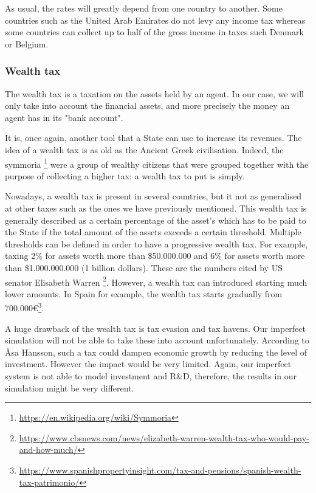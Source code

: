     As usual, the rates will greatly depend from one country to another. Some countries such as the United Arab Emirates do not levy any income tax whereas some countries can collect up to half of the gross income in taxes such Denmark or Belgium.
    
    \subsubsection{Wealth tax}\label{section:wealth_tax}
    
    The wealth tax is a taxation on the assets held by an agent. In our case, we will only take into account the financial assets, and more precisely the money an agent has in its "bank account".
    
    It is, once again, another tool that a State can use to increase its revenues. The idea of a wealth tax is as old as the Ancient Greek civilisation. Indeed, the symmoria \footnote{\url{https://en.wikipedia.org/wiki/Symmoria}} were a group of wealthy citizens that were grouped together with the purpose of collecting a higher tax: a wealth tax to put is simply.
    
    Nowadays, a wealth tax is present in several countries, but it not as generalised at other taxes such as the ones we have previously mentioned. This wealth tax is generally described as a certain percentage of the asset's which has to be paid to the State if the total amount of the assets exceeds a certain threshold. Multiple thresholds can be defined in order to have a progressive wealth tax. For example, taxing 2\% for assets worth more than \$50.000.000 and 6\% for assets worth more than \$1.000.000.000 (1 billion dollars). These are the numbers cited by US senator Elisabeth Warren \footnote{\url{https://www.cbsnews.com/news/elizabeth-warren-wealth-tax-who-would-pay-and-how-much/}}. However, a wealth tax can introduced starting much lower amounts. In Spain for example, the wealth tax starts gradually from 700.000\euro \footnote{\url{https://www.spanishpropertyinsight.com/tax-and-pensions/spanish-wealth-tax-patrimonio/}}.
    
    A huge drawback of the wealth tax is tax evasion and tax havens. Our imperfect simulation will not be able to take these into account unfortunately. According to Åsa Hansson, such a tax could dampen economic growth by reducing the level of investment. However the impact would be very limited.\cite{hansson2010wealth} Again, our imperfect system is not able to model investment and R\&D, therefore, the results in our simulation might be very different.


